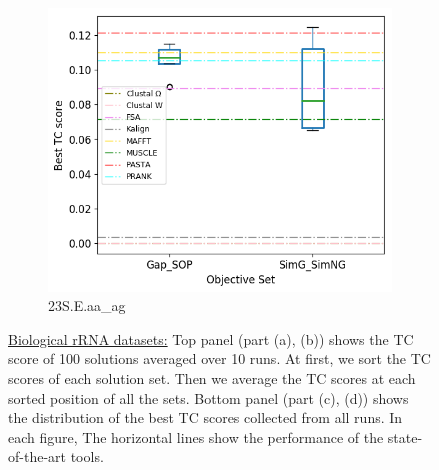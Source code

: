 \begin{figure}[!htbp]
\begin{adjustwidth}{-0.2cm}{}
\begin{subfigure}{0.5\columnwidth}
			\includegraphics[width=\columnwidth]{Figure/summary/precomputedInit/23S.E.aa_ag/objset_tc_rank}
			\caption{23S.E.aa\_ag}
		\end{subfigure}
	\end{adjustwidth}
	\caption{\underline{Biological rRNA datasets:} Top panel (part (a), (b)) shows the TC score of 100  solutions averaged over 10 runs. At first, we sort the TC scores of each solution set. Then we average the TC scores at each sorted position of all the sets. Bottom panel (part (c), (d)) shows the distribution of the best TC scores collected from all runs. In each figure, The horizontal lines show the performance of the state-of-the-art tools.}
	\label{fig:tc_bio}
\end{figure}

